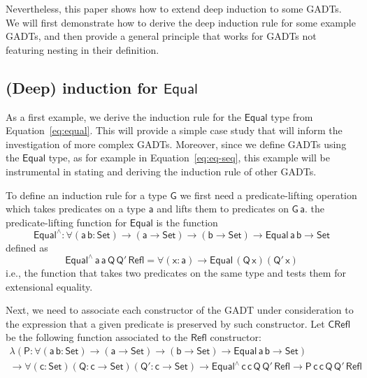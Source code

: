 \documentclass[acmsmall,screen,review,anonymous]{acmart}
\theoremstyle{definition}
\begin{document}
Nevertheless, this paper shows how to extend deep induction to some GADTs.
We will first demonstrate how to derive the deep induction rule for some example GADTs,
and then provide a general principle that works for GADTs not featuring nesting in their definition.



\subsection{(Deep) induction for $\mathsf{Equal}$}\label{sec:ind-equal}


As a first example, we derive the induction rule for the $\mathsf{Equal}$ type from Equation~\ref{eq:equal}.
This will provide a simple case study that will inform the investigation of more complex GADTs.
Moreover, since we define GADTs using the $\mathsf{Equal}$ type,
as for example in Equation~\ref{eq:eq-seq},
this example will be instrumental in stating and deriving the induction rule of other GADTs.

To define an induction rule for a type $\mathsf{G}$ we first need a predicate-lifting operation
which takes predicates on a type $\mathsf{a}$ and lifts them to predicates on $\mathsf{G\,a}$.
the predicate-lifting function for $\mathsf{Equal}$ is the function
\[
\mathsf{Equal^{\wedge} : \forall (a\,b : Set) \to (a \to Set) \to (b \to Set) \to Equal\,a\,b \to Set}
\]
defined as
\[
\mathsf{Equal^{\wedge}\,a\,a\,Q\,Q'\,Refl = \forall (x : a) \to Equal\,(Q\,x)(Q'\,x)}
\]
i.e., the function that takes two predicates on the same type and tests them for extensional equality.

Next, we need to associate each constructor of the GADT under consideration
to the expression that a given predicate is preserved by such constructor.
Let $\mathsf{CRefl}$ be the following function associated to the $\mathsf{Refl}$ constructor:
\begin{multline*}
\mathsf{\lambda (P : \forall (a\,b : Set) \to (a \to Set) \to (b \to Set) \to Equal\,a\,b \to Set)} \\
\mathsf{\to \forall (c : Set) (Q : c \to Set) (Q' : c \to Set) \to Equal^{\wedge}\,c\,c\,Q\,Q'\,Refl \to P\,c\,c\,Q\,Q'\,Refl}
\end{multline*}
\end{document}
